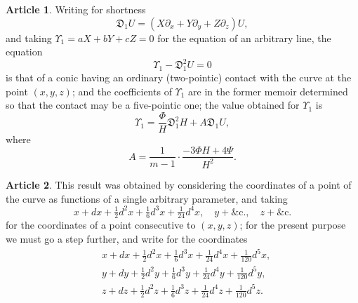 \documentclass[12pt,a4paper]{article}
\theoremstyle{definition}
\newtheorem{art}{Article}[section]
\begin{document}
\begin{art}
Writing for shortness
\[
\mathfrak{D}_1 U = (X\partial_x + Y\partial_y + Z\partial_z)U,
\]
and taking $\Upsilon_1 = aX + bY + cZ = 0$ for the equation of an arbitrary line, the equation
\[
\Upsilon_1 - \mathfrak{D}_1^2 U = 0
\]
is that of a conic having an ordinary (two-pointic) contact with the curve at the point $(x, y, z)$; and the coefficients of $\Upsilon_1$ are in the former memoir determined so that the contact may be a five-pointic one; the value obtained for $\Upsilon_1$ is
\[
\Upsilon_1 = \frac{\Phi}{H} \mathfrak{D}_1^2 H + A \mathfrak{D}_1 U,
\]
where
\[
A = \frac{1}{m - 1} \cdot \frac{-3\Phi H + 4\Psi}{H^2}.
\]
\end{art}

\begin{art}
This result was obtained by considering the coordinates of a point of the curve as functions of a single arbitrary parameter, and taking
\[
x + dx + \tfrac{1}{2}d^2x + \tfrac{1}{6}d^3x + \tfrac{1}{24}d^4x, \quad y + \text{\&c.}, \quad z + \text{\&c.}
\]
for the coordinates of a point consecutive to $(x, y, z)$; for the present purpose we must go a step further, and write for the coordinates
\begin{align*}
&x + dx + \tfrac{1}{2}d^2x + \tfrac{1}{6}d^3x + \tfrac{1}{24}d^4x + \tfrac{1}{120}d^5x, \\
&y + dy + \tfrac{1}{2}d^2y + \tfrac{1}{6}d^3y + \tfrac{1}{24}d^4y + \tfrac{1}{120}d^5y, \\
&z + dz + \tfrac{1}{2}d^2z + \tfrac{1}{6}d^3z + \tfrac{1}{24}d^4z + \tfrac{1}{120}d^5z.
\end{align*}
\end{art}
\end{document}
